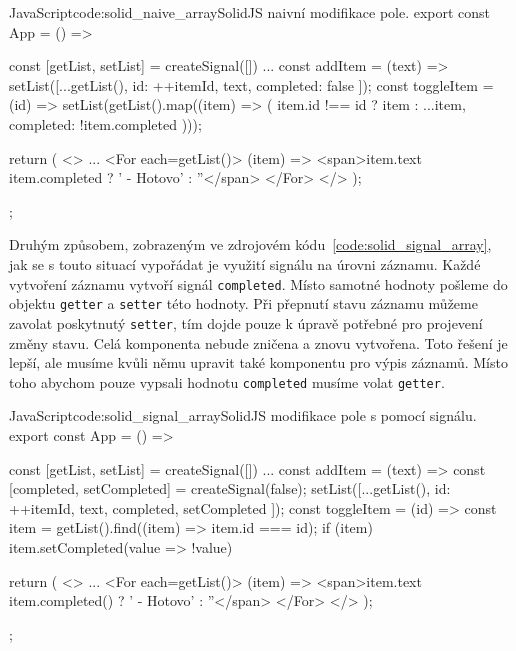 \documentclass[
  master,
  program=ainf,
  tables=false,
  sourcecodes,
  glossaries,
  index
]{kidiplom}
\begin{document}
  \begin{kicode}{JavaScript}{code:solid_naive_array}{SolidJS naivní modifikace pole.}
    export const App = () => {
      const [getList, setList] = createSignal([])
      ...
      const addItem = (text) => {
        setList([...getList(), { id: ++itemId, text, completed: false }]);
      }
      const toggleItem = (id) => {
        setList(getList().map((item) => (
          item.id !== id ? item : { ...item, completed: !item.completed }
        )));
      }

      return (
        <>
          ...
          <For each={getList()}>
            {(item) => {<span>{item.text} {item.completed ? ' - Hotovo' : ''</span>} }}
          </For>
        </>
      );
    };
\end{kicode}

Druhým způsobem, zobrazeným ve zdrojovém kódu~\ref{code:solid_signal_array}, jak se s touto situací vypořádat 
je využití signálu na úrovni záznamu. Každé vytvoření
záznamu vytvoří signál {\tt completed}. Místo samotné hodnoty pošleme do objektu {\tt getter} a {\tt setter} této hodnoty.
Při přepnutí stavu záznamu můžeme zavolat poskytnutý {\tt setter}, tím dojde pouze k úpravě potřebné pro projevení
změny stavu. Celá komponenta nebude zničena a znovu vytvořena. Toto řešení je lepší, ale musíme kvůli němu
upravit také komponentu pro výpis záznamů. Místo toho abychom pouze vypsali hodnotu {\tt completed} musíme volat
{\tt getter}.

  \begin{kicode}{JavaScript}{code:solid_signal_array}{SolidJS modifikace pole s pomocí signálu.}
    export const App = () => {
      const [getList, setList] = createSignal([])
      ...
      const addItem = (text) => {
        const [completed, setCompleted] = createSignal(false); 
        setList([...getList(), { id: ++itemId, text, completed, setCompleted }]);
      }
      const toggleItem = (id) => {
        const item = getList().find((item) => item.id === id);
        if (item) item.setCompleted(value => !value)
      }

      return (
        <>
          ...
          <For each={getList()}>
            {(item) => {<span>{item.text} {item.completed() ? ' - Hotovo' : ''</span>} }}
          </For>
        </>
      );
    };
\end{kicode}
\end{document}
